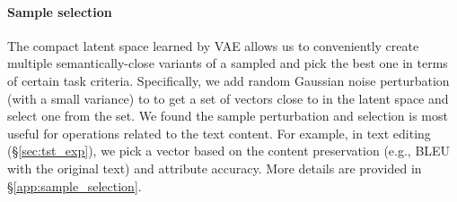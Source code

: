 \documentclass[11pt]{article}
\begin{document}
\paragraph{Sample selection}
The compact latent space learned by VAE allows us to conveniently create multiple semantically-close variants of a sampled  and pick the best one in terms of certain task criteria. Specifically, we add random Gaussian noise perturbation (with a small variance) to  to get a set of vectors close to  in the latent space and select one from the set. We found the sample perturbation and selection is most useful for operations related to the text content. For example, in text editing (\S\ref{sec:tst_exp}), we pick a vector based on the content preservation (e.g., BLEU with the original text) and attribute accuracy. More details are provided in \S\ref{app:sample_selection}.









 
\end{document}
